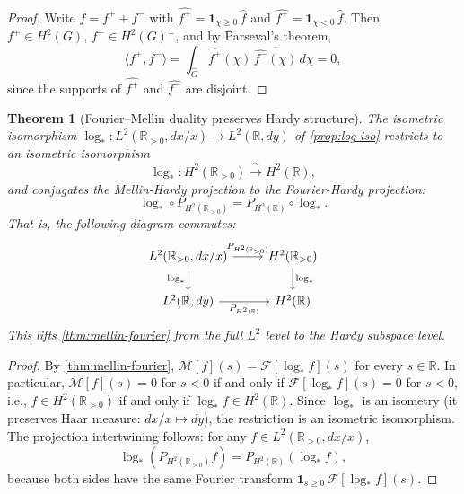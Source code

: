 \documentclass[12pt]{amsart}
\newtheorem{theorem}{Theorem}[section]
\theoremstyle{definition}
\theoremstyle{remark}
\newcommand{\R}{\mathbb{R}}
\newcommand{\Rpos}{\mathbb{R}_{>0}}
\newcommand{\cF}{\mathcal{F}}
\newcommand{\cM}{\mathcal{M}}
\newcommand{\Htwo}{H^2}
\begin{document}
\begin{proof}
Write $f = f^+ + f^-$ with $\widehat{f^+} = \mathbf{1}_{\chi \geq 0}\,\widehat{f}$ and $\widehat{f^-} = \mathbf{1}_{\chi < 0}\,\widehat{f}$. Then $f^+ \in \Htwo(G)$, $f^- \in \Htwo(G)^\perp$, and by Parseval's theorem,
\[
\langle f^+, f^- \rangle = \int_{\widehat{G}} \widehat{f^+}(\chi)\, \overline{\widehat{f^-}(\chi)}\, d\chi = 0,
\]
since the supports of $\widehat{f^+}$ and $\widehat{f^-}$ are disjoint.
\end{proof}

\begin{theorem}[Fourier--Mellin duality preserves Hardy structure]\label{thm:hardy-duality}
The isometric isomorphism $\log_* : L^2(\Rpos, dx/x) \to L^2(\R, dy)$ of \cref{prop:log-iso} restricts to an isometric isomorphism
\[
\log_* : \Htwo(\Rpos) \xrightarrow{\;\sim\;} \Htwo(\R),
\]
and conjugates the Mellin-Hardy projection to the Fourier-Hardy projection:
\[
\log_* \circ P_{\Htwo(\Rpos)} = P_{\Htwo(\R)} \circ \log_*.
\]
That is, the following diagram commutes:
\begin{equation}\label{eq:cd-hardy}
\begin{tikzcd}
L^2(\Rpos, dx/x) \arrow[r, "P_{\Htwo(\Rpos)}"] \arrow[d, "\log_*"'] & \Htwo(\Rpos) \arrow[d, "\log_*"] \\
L^2(\R, dy) \arrow[r, "P_{\Htwo(\R)}"'] & \Htwo(\R)
\end{tikzcd}
\end{equation}
This lifts \cref{thm:mellin-fourier} from the full $L^2$ level to the Hardy subspace level.
\end{theorem}

\begin{proof}
By \cref{thm:mellin-fourier}, $\cM[f](s) = \cF[\log_* f](s)$ for every $s \in \R$. In particular, $\cM[f](s) = 0$ for $s < 0$ if and only if $\cF[\log_* f](s) = 0$ for $s < 0$, i.e., $f \in \Htwo(\Rpos)$ if and only if $\log_* f \in \Htwo(\R)$. Since $\log_*$ is an isometry (it preserves Haar measure: $dx/x \mapsto dy$), the restriction is an isometric isomorphism. The projection intertwining follows: for any $f \in L^2(\Rpos, dx/x)$,
\[
\log_*(P_{\Htwo(\Rpos)} f) = P_{\Htwo(\R)}(\log_* f),
\]
because both sides have the same Fourier transform $\mathbf{1}_{s \geq 0}\, \cF[\log_* f](s)$.
\end{proof}
\end{document}
